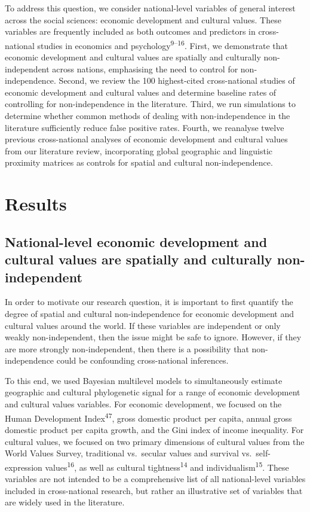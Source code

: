 \documentclass[
  man,floatsintext]{apa6}
\begin{document}
To address this question, we consider national-level variables of general interest across the social sciences: economic development and cultural values. These variables are frequently included as both outcomes and predictors in cross-national studies in economics and psychology\textsuperscript{9--16}. First, we demonstrate that economic development and cultural values are spatially and culturally non-independent across nations, emphasising the need to control for non-independence. Second, we review the 100 highest-cited cross-national studies of economic development and cultural values and determine baseline rates of controlling for non-independence in the literature. Third, we run simulations to determine whether common methods of dealing with non-independence in the literature sufficiently reduce false positive rates. Fourth, we reanalyse twelve previous cross-national analyses of economic development and cultural values from our literature review, incorporating global geographic and linguistic proximity matrices as controls for spatial and cultural non-independence.

\hypertarget{results}{%
\section{Results}\label{results}}

\hypertarget{national-level-economic-development-and-cultural-values-are-spatially-and-culturally-non-independent}{%
\subsection{National-level economic development and cultural values are spatially and culturally non-independent}\label{national-level-economic-development-and-cultural-values-are-spatially-and-culturally-non-independent}}

In order to motivate our research question, it is important to first quantify the degree of spatial and cultural non-independence for economic development and cultural values around the world. If these variables are independent or only weakly non-independent, then the issue might be safe to ignore. However, if they are more strongly non-independent, then there is a possibility that non-independence could be confounding cross-national inferences.

To this end, we used Bayesian multilevel models to simultaneously estimate geographic and cultural phylogenetic signal for a range of economic development and cultural values variables. For economic development, we focused on the Human Development Index\textsuperscript{47}, gross domestic product per capita, annual gross domestic product per capita growth, and the Gini index of income inequality. For cultural values, we focused on two primary dimensions of cultural values from the World Values Survey, traditional vs.~secular values and survival vs.~self-expression values\textsuperscript{16}, as well as cultural tightness\textsuperscript{14} and individualism\textsuperscript{15}. These variables are not intended to be a comprehensive list of all national-level variables included in cross-national research, but rather an illustrative set of variables that are widely used in the literature.
\end{document}
